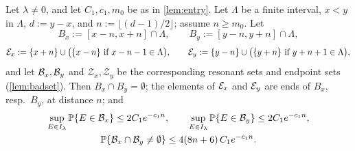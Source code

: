 \begin{lemma}\label{lem:double}
Let $\lambda\ne0$, and let $C_1,c_1,m_0$ be as in \cref{lem:entry}.  Let $\Lambda$ be a finite interval,
$x<y$ in $\Lambda$, $d:=y-x$, and $n:=\lfloor(d-1)/2\rfloor$; assume $n\ge m_0$.  Let
\[
  B_x:=[x-n,x+n]\cap\Lambda,\qquad B_y:=[y-n,y+n]\cap\Lambda,
\]
\[
  \mathcal{E}_x:=\{x+n\}\cup\bigl(\{x-n\}\text{ if }x-n-1\in\Lambda\bigr),\qquad
  \mathcal{E}_y:=\{y-n\}\cup\bigl(\{y+n\}\text{ if }y+n+1\in\Lambda\bigr),
\]
and let $\mathcal{B}_x,\mathcal{B}_y$ and $\mathcal Z_x,\mathcal Z_y$ be the corresponding resonant sets and endpoint sets
(\cref{lem:badset}).  Then $B_x\cap B_y=\emptyset$; the elements of $\mathcal{E}_x$ and $\mathcal{E}_y$ are ends of
$B_x$, resp.\ $B_y$, at distance $n$; and
\begin{gather}
  \sup_{E\in I_\lambda}\mathbb{P}\{E\in\mathcal{B}_x\}\le2C_1e^{-c_1n},\qquad
  \sup_{E\in I_\lambda}\mathbb{P}\{E\in\mathcal{B}_y\}\le2C_1e^{-c_1n},\label{eq:single}\\
  \mathbb{P}\{\mathcal{B}_x\cap\mathcal{B}_y\neq\emptyset\}\le4(8n+6)\,C_1e^{-c_1n}.\label{eq:double}
\end{gather}
\end{lemma}

